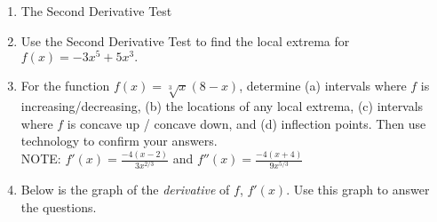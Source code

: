 \documentclass[11pt,fleqn]{article}
\begin{document}
\setlength{\parindent}{0cm}
\renewcommand{\headrulewidth}{0pt}
\newcommand{\blank}[1]{\rule{#1}{0.75pt}}
\renewcommand{\d}{\displaystyle}
\vspace*{-0.7in}
\begin{center}
 {\large{ }}
\end{center}
 \begin{enumerate}
 \item The Second Derivative Test
 \vspace{2in}
\item Use the Second Derivative Test to find the local extrema for $f(x)=-3x^5+5x^3.$
\vspace{1in}
 \item For the function $f(x)=\sqrt[3]{x}(8-x)$, determine (a) intervals where $f$ is increasing/decreasing, (b) the locations of any local extrema, (c) intervals where $f$ is concave up / concave down, and (d) inflection points. Then use technology to confirm your answers. \\NOTE: $f'(x)=\displaystyle{\frac{-4(x-2)}{3x^{2/3}}}$ and $f''(x)=\displaystyle{\frac{-4(x+4)}{9x^{5/3}}}$
 \newpage
 \item  Below is the graph of the \emph{derivative} of $f$, \large{$f'(x)$}. Use this graph to answer the questions.
 
 \begin{multicols}{2}
\quad

\vspace{.3in}
\quad

\columnbreak


\end{multicols}
\end{enumerate}
\end{document}
